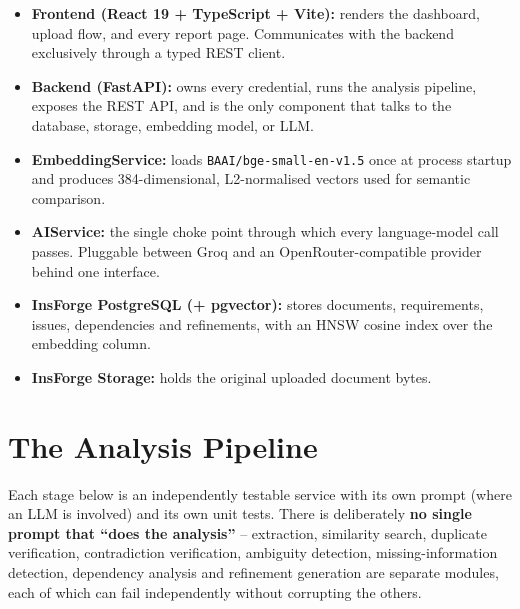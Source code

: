 \documentclass[11pt,a4paper]{article}
\begin{document}
\begin{itemize}[leftmargin=1.4em]
  \item \textbf{Frontend (React 19 + TypeScript + Vite):} renders the
        dashboard, upload flow, and every report page. Communicates with the
        backend exclusively through a typed REST client.
  \item \textbf{Backend (FastAPI):} owns every credential, runs the analysis
        pipeline, exposes the REST API, and is the only component that talks
        to the database, storage, embedding model, or LLM.
  \item \textbf{EmbeddingService:} loads \texttt{BAAI/bge-small-en-v1.5}
        once at process startup and produces 384-dimensional, L2-normalised
        vectors used for semantic comparison.
  \item \textbf{AIService:} the single choke point through which every
        language-model call passes. Pluggable between Groq and an
        OpenRouter-compatible provider behind one interface.
  \item \textbf{InsForge PostgreSQL (+ pgvector):} stores documents,
        requirements, issues, dependencies and refinements, with an HNSW
        cosine index over the embedding column.
  \item \textbf{InsForge Storage:} holds the original uploaded document
        bytes.
\end{itemize}

\section{The Analysis Pipeline}

Each stage below is an independently testable service with its own prompt
(where an LLM is involved) and its own unit tests. There is deliberately
\textbf{no single prompt that ``does the analysis''} -- extraction,
similarity search, duplicate verification, contradiction verification,
ambiguity detection, missing-information detection, dependency analysis and
refinement generation are separate modules, each of which can fail
independently without corrupting the others.
\end{document}
